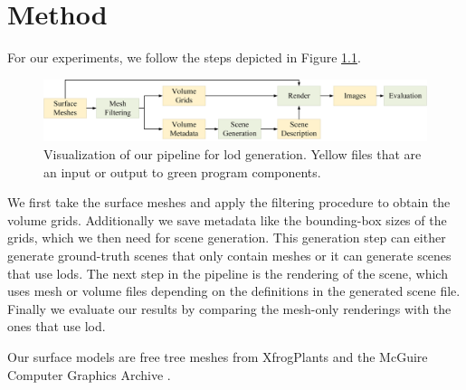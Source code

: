 \chapter{Method}
For our experiments, we follow the steps depicted in Figure \ref{fig:pipeline}.
\begin{figure}[ht]
    \centering
    \includegraphics[width=1.0\linewidth]{img/pipeline.png}
    \caption{Visualization of our pipeline for \ac{lod} generation. Yellow files that are an input or output to green program components.}
    \label{fig:pipeline}
\end{figure}
We first take the surface meshes and apply the filtering procedure to obtain the volume grids.
Additionally we save metadata like the bounding-box sizes of the grids, which we then need for scene generation.
This generation step can either generate ground-truth scenes that only contain meshes or it can generate scenes that use \acp{lod}.
The next step in the pipeline is the rendering of the scene, which uses mesh or volume files depending on the definitions in the generated scene file.
Finally we evaluate our results by comparing the mesh-only renderings with the ones that use \ac{lod}.

Our surface models are free tree meshes from XfrogPlants \cite{xfrogplants} and the McGuire Computer Graphics Archive \cite{McGuire2017Data}.

